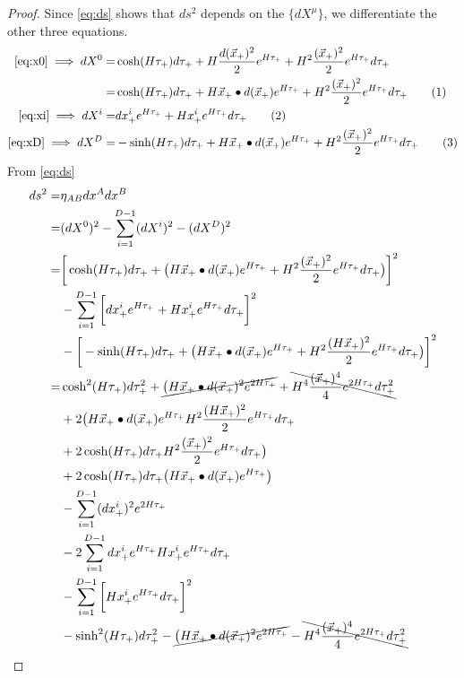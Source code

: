 \documentclass[]{article}
\newcommand\numberthis{\addtocounter{equation}{1}\tag{\theequation}}
\begin{document}
\begin{proof}
	Since \eqref{eq:ds} shows that $ds^2$ depends on the $\{dX^{\mu}\}$, we differentiate the other three equations.
	\begin{align*}
	\text{\eqref{eq:x0}}\implies dX^0=&\cosh(H\tau_+)d\tau_+ +H\frac{d(\vec{x}_+)^2}{2}e^{H\tau_+}+H^2\frac{(\vec{x}_+)^2}{2}e^{H\tau_+}d\tau_+\\
	=&\cosh(H\tau_+)d\tau_+ +H\vec{x}_+\bullet d(\vec{x}_+)e^{H\tau_+}+H^2\frac{(\vec{x}_+)^2}{2}e^{H\tau_+}d\tau_+\numberthis\label{eq:dx0}\\
	\eqref{eq:xi}\implies	dX^i=&dx^i_+e^{H\tau_+} + H x^i_+e^{H\tau_+}d\tau_+\numberthis\label{eq:dxi}\\
	\eqref{eq:xD}\implies dX^D=&-\sinh(H\tau_+)d\tau_+ +H\vec{x}_+\bullet d(\vec{x}_+)e^{H\tau_+} +H^2 \frac{(\vec{x}_+)^2}{2}e^{H\tau_+}d\tau_+ \numberthis\label{eq:dxD}
	\end{align*}
	From \eqref{eq:ds}
	\begin{align*}
	ds^2=&\eta_{AB}dx^Adx^B\\
	=&(dX^0)^2- \sum_{i=1}^{D-1}(dX^i)^2-(dX^D)^2\\
	=&\bigg[\cosh(H\tau_+)d\tau_+ +\big(H\vec{x}_+\bullet d(\vec{x}_+)e^{H\tau_+}+H^2\frac{(\vec{x}_+)^2}{2}e^{H\tau_+}d\tau_+\big)\bigg]^2\\
	&- \sum_{i=1}^{D-1}\bigg[dx^i_+e^{H\tau_+} + H x^i_+e^{H\tau_+}d\tau_+\bigg]^2\\
	&-\bigg[-\sinh(H\tau_+)d\tau_+ +\big(H\vec{x}_+\bullet d(\vec{x}_+)e^{H\tau_+} +H^2\frac{(H\vec{x}_+)^2}{2}e^{H\tau_+}d\tau_+\big)\bigg]^2\\
	=&\cosh^2(H\tau_+)d\tau_+^2+\cancel{\big(H\vec{x}_+\bullet d(\vec{x}_+)^2e^{2H\tau_+}}+\bcancel{H^4\frac{(\vec{x}_+)^4}{4}e^{2H\tau_+}d\tau_+^2}\\
	&+2\big(H\vec{x}_+\bullet d(\vec{x}_+)e^{H\tau_+} H^2\frac{(H\vec{x}_+)^2}{2}e^{H\tau_+}d\tau_+\\
	&+2\cosh(H\tau_+)d\tau_+ H^2\frac{(\vec{x}_+)^2}{2}e^{H\tau_+}d\tau_+\big)\\
	&+2\cosh(H\tau_+)d\tau_+ \big(H\vec{x}_+\bullet d(\vec{x}_+)e^{H\tau_+}\big)\\
	&- \sum_{i=1}^{D-1}(dx^i_+)^2e^{2H\tau_+} \\
	&- 2\sum_{i=1}^{D-1}dx^i_+e^{H\tau_+}  H x^i_+e^{H\tau_+}d\tau_+\\
	&- \sum_{i=1}^{D-1}\bigg[ H x^i_+e^{H\tau_+}d\tau_+\bigg]^2\\
	&-\sinh^2(H\tau_+)d\tau_+^2-\cancel{\big(H\vec{x}_+\bullet d(\vec{x}_+)^2e^{2H\tau_+}}-\bcancel{H^4\frac{(\vec{x}_+)^4}{4}e^{2H\tau_+}d\tau_+^2}\\

\end{align*}
\end{proof}
\end{document}
